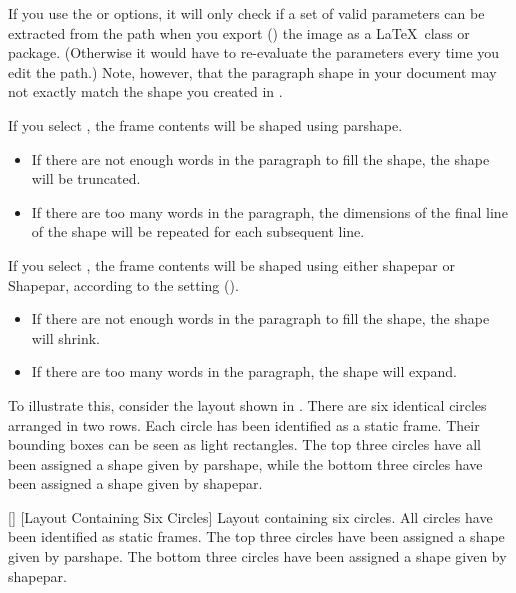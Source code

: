 If you use the 
or  options, it will only
check if a set of valid parameters can be extracted from the
\gls*{path} when you export () the image as a \LaTeX\
class or package. (Otherwise it would have to re-evaluate the
parameters every time you edit the path.) Note, however, that the
paragraph shape in your document may not exactly match the shape you
created in \FlowframTk.


If you select , the frame contents
will be shaped using \gls{parshape}.

\begin{itemize}
\item If there are not enough words in the paragraph to fill the
shape, the shape will be truncated.
\item If there are too many words in the paragraph, the dimensions
of the final line of the shape will be repeated for each
subsequent line.
\end{itemize}


If you select , the frame contents
will be shaped using either \gls{shapepar} or \gls{Shapepar},
according to the  setting
().

\begin{itemize}
\item If there are not enough words in the paragraph to fill the 
shape, the shape will shrink.
\item If there are too many words in the paragraph, the shape
will expand.
\end{itemize}

To illustrate this, consider the layout shown in 
. There are six identical circles
arranged in two rows. Each circle has been identified as a static
frame. Their bounding boxes can be seen as light \manmsg{grey} rectangles.
The top three circles have all been assigned a shape given by
\gls{parshape}, while the bottom three circles have been
assigned a shape given by \gls{shapepar}.

[]
{}
[Layout Containing Six Circles]
{Layout containing six circles. All circles have been
identified as static frames. The top three circles have been
assigned a shape given by \gls{parshape}. The bottom
three circles have been assigned a shape given by
\gls{shapepar}.}

